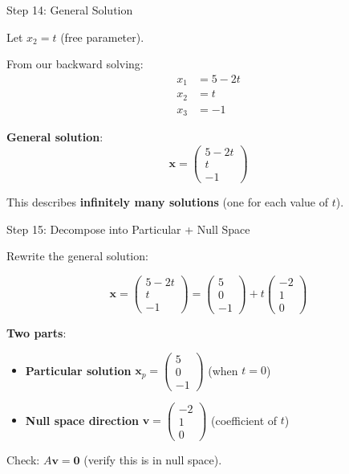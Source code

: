 \documentclass[10pt]{beamer}
\theoremstyle{definition}
\newcommand{\x}[1]{\alert{\textbf{#1}}}
\begin{document}
\begin{frame}{Step 14: General Solution}

Let $x_2 = t$ (free parameter).

\vspace{1em}

From our backward solving:
\begin{align*}
x_1 &= 5 - 2t \\
x_2 &= t \\
x_3 &= -1
\end{align*}

\vspace{1em}

\x{General solution}:
$$\mathbf{x} = \begin{pmatrix} 5 - 2t \\ t \\ -1 \end{pmatrix}$$

\vspace{1em}

This describes \x{infinitely many solutions} (one for each value of $t$).

\end{frame}

\begin{frame}{Step 15: Decompose into Particular + Null Space}

Rewrite the general solution:

$$\mathbf{x} = \begin{pmatrix} 5 - 2t \\ t \\ -1 \end{pmatrix} = \begin{pmatrix} 5 \\ 0 \\ -1 \end{pmatrix} + t \begin{pmatrix} -2 \\ 1 \\ 0 \end{pmatrix}$$

\vspace{1em}

\x{Two parts}:
\begin{itemize}
\item \x{Particular solution} $\mathbf{x}_p = \begin{pmatrix} 5 \\ 0 \\ -1 \end{pmatrix}$ (when $t=0$)
\item \x{Null space direction} $\mathbf{v} = \begin{pmatrix} -2 \\ 1 \\ 0 \end{pmatrix}$ (coefficient of $t$)
\end{itemize}

\vspace{1em}

Check: $A\mathbf{v} = \mathbf{0}$ (verify this is in null space).

\end{frame}
\end{document}
